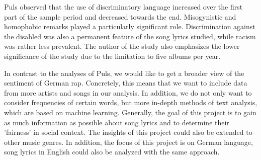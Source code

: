 Puls observed that the use of discriminatory language increased over the first part of the sample period and decreased towards the end. Misogynistic and homophobic remarks played a particularly significant role. Discrimination against the disabled was also a permanent feature of the song lyrics studied, while racism was rather less prevalent. The author of the study also emphasizes the lower significance of the study due to the limitation to five albums per year.



In contrast to the analyses of Puls, we would like to get a broader view of the sentiment of German rap. Concretely, this means that we want to include data from more artists and songs in our analysis. In addition, we do not only want to consider frequencies of certain words, but more in-depth methods of text analysis, which are based on machine learning. Generally, the goal of this project is to gain as much information as possible about song lyrics and to determine their 'fairness' in social context. The insights of this project could also be extended to other music genres. In addition, the focus of this project is on German language, song lyrics in English could also be analyzed with the same approach.

